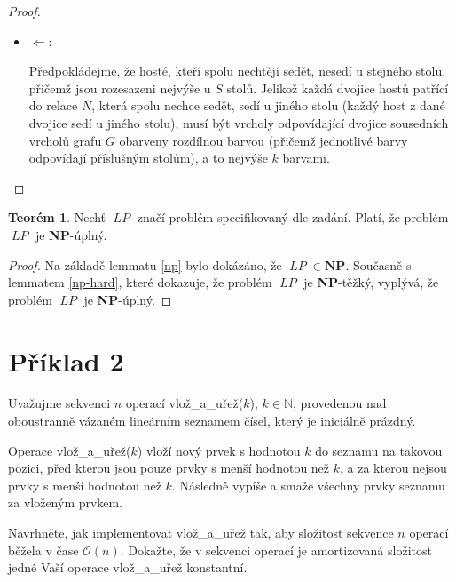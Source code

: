 \documentclass[a4paper, 12pt]{article}
\newcommand\lp{\mathop{\mbox{$\mathit{LP}$}}}
\theoremstyle{definition}
\theoremstyle{definition}
\newtheorem{theorem}{Teorém}[section]
\theoremstyle{definition}
\theoremstyle{remark}
\theoremstyle{remark}
\theoremstyle{remark}
\theoremstyle{remark}
\begin{document}
\begin{proof}
\begin{itemize}
        \item $\Leftarrow$:
        
        Předpokládejme, že hosté, kteří spolu nechtějí sedět, nesedí u stejného stolu, přičemž jsou rozesazeni nejvýše u $S$ stolů. Jelikož každá dvojice hostů patřící do relace $N$, která spolu nechce sedět, sedí u jiného stolu (každý host z dané dvojice sedí u jiného stolu), musí být vrcholy odpovídající dvojice sousedních vrcholů grafu $G$ obarveny rozdílnou barvou (přičemž jednotlivé barvy odpovídají příslušným stolům), a to nejvýše $k$ barvami.
    \end{itemize}
    
\end{proof}

\begin{theorem}
    Nechť $\lp$ značí problém specifikovaný dle zadání. Platí, že problém $\lp$ je \textbf{NP}-úplný.
\end{theorem}

\begin{proof}
    Na základě lemmatu \ref{np} bylo dokázáno, že $\lp \in \textbf{NP}$. Současně s lemmatem \ref{np-hard}, které dokazuje, že problém $\lp$ je \textbf{NP}-těžký, vyplývá, že problém $\lp$ je \textbf{NP}-úplný.
\end{proof}

\section{Příklad 2}
Uvažujme sekvenci $n$ operací {\selectfont vlož\_a\_uřež}($k$), $k \in \mathbb{N}$, provedenou nad oboustranně vázaném lineárním seznamem čísel, který je iniciálně prázdný.

\vspace{0.25cm}

\noindent
Operace {\selectfont vlož\_a\_uřež}($k$) vloží nový prvek s hodnotou $k$ do seznamu na takovou pozici, před kterou jsou pouze prvky s menší hodnotou než $k$, a za kterou nejsou prvky s menší hodnotou než $k$. Následně vypíše a smaže všechny prvky seznamu za vloženým prvkem.

\vspace{0.25cm}

\noindent
Navrhněte, jak implementovat {\selectfont vlož\_a\_uřež} tak, aby složitost sekvence $n$ operací běžela v čase $\mathcal{O}(n)$. Dokažte, že v sekvenci operací je amortizovaná složitost jedné Vaší operace {\selectfont vlož\_a\_uřež} konstantní.
\end{document}
